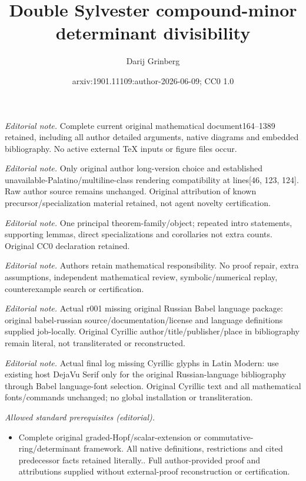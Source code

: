 \documentclass[numbers=enddot,12pt,final,onecolumn,notitlepage]{scrartcl}%
\title{Double Sylvester compound-minor determinant divisibility}
\author{Darij Grinberg}
\date{arxiv:1901.11109:author-2026-06-09; CC0 1.0}
\theoremstyle{definition}
\begin{document}
\maketitle
\noindent\textit{Editorial note.} Complete current original mathematical document164--1389 retained, including all author detailed arguments, native diagrams and embedded bibliography. No active external TeX inputs or figure files occur.\par\medskip
\noindent\textit{Editorial note.} Only original author long-version choice and established unavailable-Palatino/multiline-class rendering compatibility at lines[46, 123, 124]. Raw author source remains unchanged. Original attribution of known precursor/specialization material retained, not agent novelty certification.\par\medskip
\noindent\textit{Editorial note.} One principal theorem-family/object; repeated intro statements, supporting lemmas, direct specializations and corollaries not extra counts. Original CC0 declaration retained.\par\medskip
\noindent\textit{Editorial note.} Authors retain mathematical responsibility. No proof repair, extra assumptions, independent mathematical review, symbolic/numerical replay, counterexample search or certification.\par\medskip
\noindent\textit{Editorial note.} Actual r001 missing original Russian Babel language package: original babel-russian source/documentation/license and language definitions supplied job-locally. Original Cyrillic author/title/publisher/place in bibliography remain literal, not transliterated or reconstructed.\par\medskip
\noindent\textit{Editorial note.} Actual final log missing Cyrillic glyphs in Latin Modern: use existing host DejaVu Serif only for the original Russian-language bibliography through Babel language-font selection. Original Cyrillic text and all mathematical fonts/commands unchanged; no global installation or transliteration.\par\medskip
\noindent\textit{Allowed standard prerequisites (editorial).}\begin{itemize}
\item Complete original graded-Hopf/scalar-extension or commutative-ring/determinant framework. All native definitions, restrictions and cited predecessor facts retained literally.. Full author-provided proof and attributions supplied without external-proof reconstruction or certification.
\end{itemize}\medskip
\end{document}
